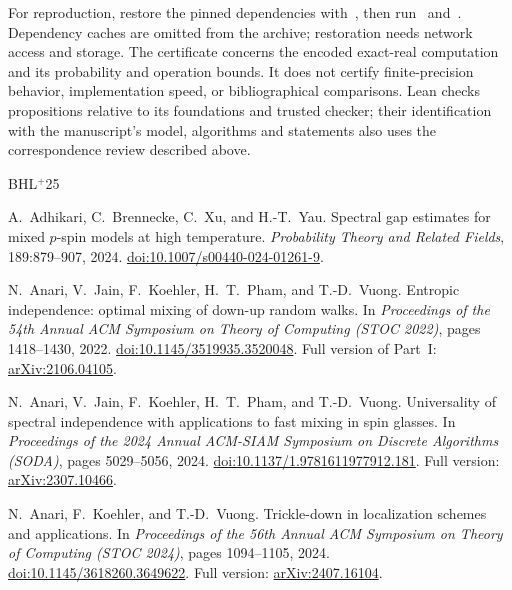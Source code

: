 \documentclass[10pt]{article}
\theoremstyle{plain}
\theoremstyle{definition}
\theoremstyle{remark}
\begin{document}
For reproduction, restore the pinned dependencies with~, then run~ and~. Dependency caches are omitted from the archive; restoration needs network access and storage. The certificate concerns the encoded exact-real computation and its probability and operation bounds. It does not certify finite-precision behavior, implementation speed, or bibliographical comparisons. Lean checks propositions relative to its foundations and trusted checker; their identification with the manuscript's model, algorithms and statements also uses the correspondence review described above.

\begin{thebibliography}{BHL$^+$25}

A.~Adhikari, C.~Brennecke, C.~Xu, and H.-T.~Yau.
\newblock Spectral gap estimates for mixed $p$-spin models at high temperature.
\newblock \emph{Probability Theory and Related Fields}, 189:879--907, 2024.
\newblock \href{https://doi.org/10.1007/s00440-024-01261-9}{doi:10.1007/s00440-024-01261-9}.

N.~Anari, V.~Jain, F.~Koehler, H.~T.~Pham, and T.-D.~Vuong.
\newblock Entropic independence: optimal mixing of down-up random walks.
\newblock In \emph{Proceedings of the 54th Annual ACM Symposium on Theory of Computing (STOC 2022)}, pages 1418--1430, 2022.
\newblock \href{https://doi.org/10.1145/3519935.3520048}{doi:10.1145/3519935.3520048}.
\newblock Full version of Part~I: \href{https://arxiv.org/abs/2106.04105}{arXiv:2106.04105}.

N.~Anari, V.~Jain, F.~Koehler, H.~T.~Pham, and T.-D.~Vuong.
\newblock Universality of spectral independence with applications to fast mixing in spin glasses.
\newblock In \emph{Proceedings of the 2024 Annual ACM-SIAM Symposium on Discrete Algorithms (SODA)}, pages 5029--5056, 2024.
\newblock \href{https://doi.org/10.1137/1.9781611977912.181}{doi:10.1137/1.9781611977912.181}.
\newblock Full version: \href{https://arxiv.org/abs/2307.10466}{arXiv:2307.10466}.

N.~Anari, F.~Koehler, and T.-D.~Vuong.
\newblock Trickle-down in localization schemes and applications.
\newblock In \emph{Proceedings of the 56th Annual ACM Symposium on Theory of Computing (STOC 2024)}, pages 1094--1105, 2024.
\newblock \href{https://doi.org/10.1145/3618260.3649622}{doi:10.1145/3618260.3649622}.
\newblock Full version: \href{https://arxiv.org/abs/2407.16104}{arXiv:2407.16104}.


\end{thebibliography}
\end{document}
